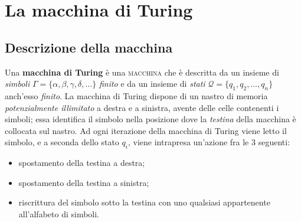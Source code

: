 \documentclass[10pt]{\classname}
\theoremstyle{definition}
\theoremstyle{definition}
\begin{document}
%


\chapter{La macchina di Turing}
\section{Descrizione della macchina}

Una \textbf{macchina di Turing} è una \textsc{macchina} che è descritta da un insieme di
\emph{simboli} $\Gamma = \{\alpha, \beta, \gamma, \delta, \dots\}$ \emph{finito} e da
un insieme di \emph{stati} $\mathcal{Q} = \{q_1, q_2, \dots, q_n\}$ anch'esso
\emph{finito}. La macchina di Turing dispone di un nastro di memoria
\emph{potenzialmente illimitato} a destra e a sinistra, avente delle celle
contenenti i simboli; essa identifica il simbolo nella posizione dove la
\emph{testina} della macchina è collocata sul nastro. Ad ogni iterazione della
macchina di Turing viene letto il simbolo, e a seconda dello stato $q_i$, viene
intrapresa un'azione fra le $3$ seguenti:
\begin{itemize}
    \item spostamento della testina a destra;
    \item spostamento della testina a sinistra;
    \item riscrittura del simbolo sotto la testina con uno qualsiasi
        appartenente all'alfabeto di simboli.
\end{itemize}
\end{document}
